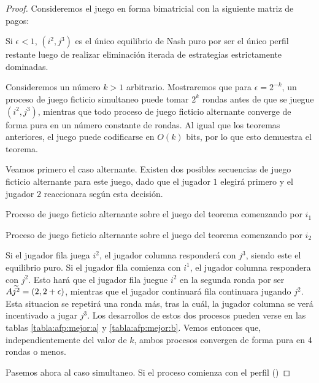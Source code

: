 \begin{proof}
    Consideremos el juego en forma bimatricial con la siguiente matriz de pagos:

    

    Si $\epsilon < 1$, $(i^2, j^3)$ es el único equilibrio de Nash puro por ser el único perfil restante luego de realizar eliminación iterada de estrategias estrictamente dominadas.

    Consideremos un número $k > 1$ arbitrario. Mostraremos que para $\epsilon = 2^{-k}$, un proceso de juego ficticio simultaneo puede tomar $2^k$ rondas antes de que se juegue $(i^2, j^3)$, mientras que todo proceso de juego ficticio alternante converge de forma pura en un número constante de rondas. Al igual que los teoremas anteriores, el juego puede codificarse en $O(k)$ bits, por lo que esto demuestra el teorema.

    Veamos primero el caso alternante. Existen dos posibles secuencias de juego ficticio alternante para este juego, dado que el jugador $1$ elegirá primero y el jugador $2$ reaccionara según esta decisión.

    \begin{table}
        \centering
        
        \caption{Proceso de juego ficticio alternante sobre el juego del teorema \label{teorema:afp:mejor} comenzando por $i_1$}
        \label{tabla:afp:mejor:a}
        \centering
        
        \caption{Proceso de juego ficticio alternante sobre el juego del teorema \label{teorema:afp:mejor} comenzando por $i_2$}
        \label{tabla:afp:mejor:b}
    \end{table}

    Si el jugador fila juega $i^2$, el jugador columna responderá con $j^3$, siendo este el equilibrio puro. Si el jugador fila comienza con $i^1$, el jugador columna respondera con $j^2$. Esto hará que el jugador fila juegue $i^2$ en la segunda ronda por ser $A\widetilde{j^2} = (2, 2 + \epsilon)$, mientras que el jugador continuará fila continuara jugando $j^2$. Esta situacion se repetirá una ronda más, tras la cuál, la jugador columna se verá incentivado a jugar $j^3$. Los desarrollos de estos dos procesos pueden verse en las tablas \ref{tabla:afp:mejor:a} y \ref{tabla:afp:mejor:b}. Vemos entonces que, independientemente del valor de $k$, ambos procesos convergen de forma pura en 4 rondas o menos.

    Pasemos ahora al caso simultaneo. Si el proceso comienza con el perfil ()


\end{proof}